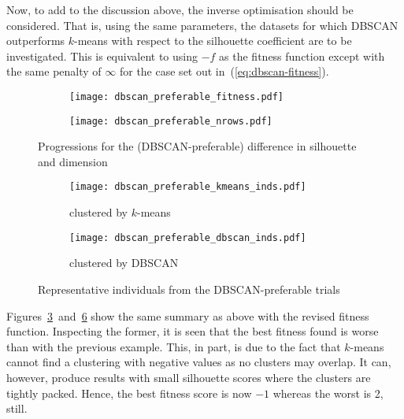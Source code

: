 Now, to add to the discussion above, the inverse optimisation should be
considered. That is, using the same parameters, the datasets for which DBSCAN
outperforms \(k\)-means with respect to the silhouette coefficient are to be
investigated. This is equivalent to using \(-f\) as the fitness function
except with the same penalty of \(\infty\) for the case set out
in~(\ref{eq:dbscan-fitness}).

\begin{figure}[htbp]
    \centering
    \begin{subfigure}{\imgwidth}
        \texttt{[image: dbscan\_preferable\_fitness.pdf]}
        \label{fig:dbscan_preferable_fitness}
    \end{subfigure}

    \begin{subfigure}{\imgwidth}
        \texttt{[image: dbscan\_preferable\_nrows.pdf]}
        \label{fig:dbscan_preferable_nrows}
    \end{subfigure}
    \caption{%
        Progressions for the (DBSCAN-preferable) difference in silhouette and
        dimension
    }\label{fig:negative-prog}
\end{figure}

\begin{figure}
    \centering
    \begin{subfigure}{\imgwidth}
        \centering
        \texttt{[image: dbscan\_preferable\_kmeans\_inds.pdf]}
        \caption{%
            clustered by \(k\)-means
        }\label{fig:dbscan_preferable_kmeans_inds}
    \end{subfigure}

    \vspace{1em}
    \begin{subfigure}{\imgwidth}
        \centering
        \texttt{[image: dbscan\_preferable\_dbscan\_inds.pdf]}
        \caption{clustered by DBSCAN}\label{fig:dbscan_preferable_dbscan_inds}
    \end{subfigure}
    \caption{%
        Representative individuals from the DBSCAN-preferable trials
    }\label{fig:negative-inds}
\end{figure}

Figures~\ref{fig:negative-prog}~and~\ref{fig:negative-inds} show the same
summary as above with the revised fitness function. Inspecting the former, it is
seen that the best fitness found is worse than with the previous example. This,
in part, is due to the fact that \(k\)-means cannot find a clustering with
negative values as no clusters may overlap. It can, however, produce results
with small silhouette scores where the clusters are tightly packed. Hence, the
best fitness score is now \(-1\) whereas the worst is 2, still.

